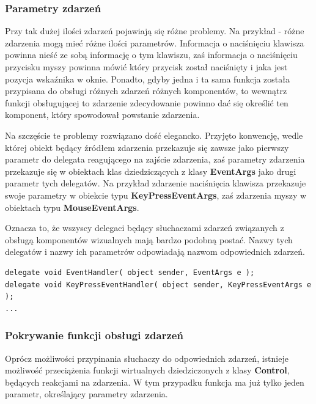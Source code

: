 \subsubsection{Parametry zdarzeń}

Przy tak dużej ilości zdarzeń pojawiają się różne problemy. Na przykład - 
różne zdarzenia mogą mieć różne ilości parametrów. Informacja o naciśnięciu klawisza
powinna nieść ze sobą informację o tym klawiszu, zaś informacja o naciśnięciu przycisku myszy powinna mówić
który przycisk został naciśnięty i jaka jest pozycja wskaźnika w oknie. Ponadto, gdyby jedna i ta sama
funkcja została przypisana do obsługi różnych zdarzeń różnych komponentów, to wewnątrz funkcji obsługującej
to zdarzenie zdecydowanie powinno dać się określić ten komponent, który spowodował powstanie zdarzenia.

Na szczęście te problemy rozwiązano dość elegancko. Przyjęto konwencję, wedle której obiekt będący
źródłem zdarzenia przekazuje się zawsze jako pierwszy parametr do delegata reagującego na zajście zdarzenia,
zaś parametry zdarzenia przekazuje się w obiektach klas dziedziczących z klasy {\bf EventArgs} jako drugi
parametr tych delegatów. Na przykład zdarzenie naciśnięcia
klawisza przekazuje swoje parametry w obiekcie typu {\bf KeyPressEventArgs}, zaś zdarzenia myszy w
obiektach typu {\bf MouseEventArgs}. 

Oznacza to, że wszyscy delegaci będący słuchaczami zdarzeń związanych z obsługą komponentów wizualnych mają
bardzo podobną postać. Nazwy tych delegatów i nazwy ich parametrów odpowiadają nazwom odpowiednich zdarzeń.

\begin{scriptsize}
\begin{verbatim}
delegate void EventHandler( object sender, EventArgs e );
delegate void KeyPressEventHandler( object sender, KeyPressEventArgs e );
...
\end{verbatim}
\end{scriptsize}

\subsubsection{Pokrywanie funkcji obsługi zdarzeń}

Oprócz możliwości przypinania słuchaczy do odpowiednich zdarzeń, istnieje możliwość
przeciążenia funkcji wirtualnych dziedziczonych z klasy {\bf Control}, będących reakcjami na zdarzenia.
W tym przypadku funkcja ma już tylko jeden parametr, określający parametry zdarzenia.

